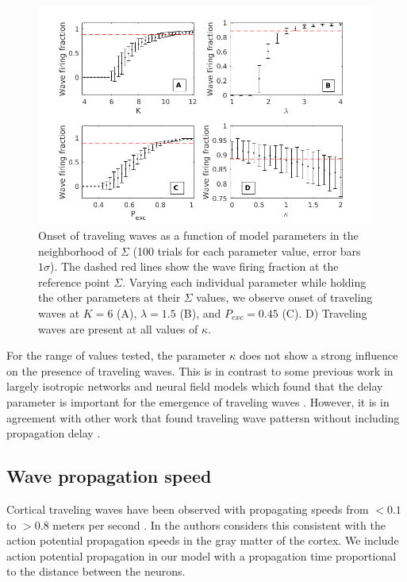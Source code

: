 \documentclass[12pt]{article}
\begin{document}
\begin{figure}[!htb]
 \centering
 \includegraphics[width=\textwidth]{fig/ParamWaveSim}
 \caption{Onset of traveling waves as a function of model parameters in the neighborhood of $\Sigma$ (100 trials for each parameter value, error bars $1\sigma$). 
         The dashed red lines show the wave firing fraction at the \color{red}reference \color{black} point $\Sigma$.  
         Varying each individual parameter while holding the other parameters at their $\Sigma$ values, we observe onset of traveling waves at $K=6$ (A), $\lambda=1.5$ (B), and $P_{exc}=0.45$ (C).  
         D) Traveling waves are present at all values of $\kappa$. }
 \label{fig:wave_parameters}
\end{figure}

\FloatBarrier

For the range of values tested, the parameter $\kappa$ does not show a strong influence on the presence of traveling waves. 
\color{red} This is in contrast to some previous work in largely isotropic networks and neural field models which found that the delay parameter is important for the emergence of traveling waves \parencite{Senk2020}\parencite{Atay2006}\parencite{Roxin2005}.
However, it is in agreement with other work that found traveling wave pattersn without including propagation delay \parencite{Folias2012}\parencite{Wyller2007}.
\color{black}

\subsection{Wave propagation speed} \label{sub:propagation_speed}
Cortical traveling waves have been observed with propagating speeds from \color{red}$<0.1$ to $>0.8$ meters per second \parencite{Sato2012}\parencite{Golomb1997}\parencite{Chervin1988}\color{black}.
\color{red}In \parencite{Muller2018} the authors considers this \color{black} consistent with the action potential propagation speeds in the gray matter of the cortex. 
We include action potential propagation in our model with a propagation \color{red}time proportional to the distance between the neurons\color{black}.
\end{document}
